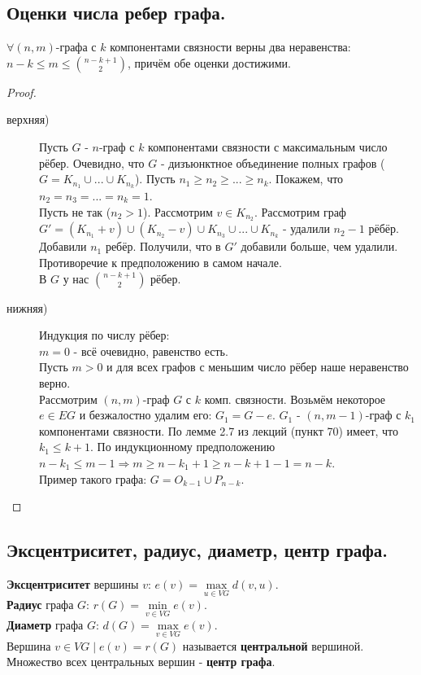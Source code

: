\documentclass[12pt]{article}
\begin{document}
\subsection{Оценки числа ребер графа.}
		$\forall (n,m)$-графа с $k$ компонентами связности верны два неравенства: $ \displaystyle n-k \le m \le \binom{n-k+1}{2}$, причём обе оценки достижими.
	\begin{proof}\hfil
		\begin{description}
			\item[верхняя)] Пусть $G$ - $n$-граф с $k$ компонентами связности с максимальным число рёбер. Очевидно, что $G$ - дизъюнктное объединение полных графов
				($G = K_{n_1} \cup ... \cup K_{n_k}$). Пусть $n_1 \ge n_2 \ge ... \ge n_k$. Покажем, что $n_2 = n_3 = ... = n_k = 1$.\\
				Пусть не так ($n_2 > 1$). Рассмотрим $v \in K_{n_2}$. Рассмотрим граф $G' = (K_{n_1} + v) \cup (K_{n_2} - v) \cup K_{n_3} \cup ... \cup K_{n_k} $ - 
				удалили $n_2-1$ рёбёр. Добавили $n_1$ ребёр. Получили, что в $G'$ добавили больше, чем удалили. Противоречие к предположению в самом начале.\\
				В $G$ у нас $\binom{n-k+1}{2}$ рёбер.
			\item[нижняя)] Индукция по числу рёбер:\\
				$m=0$ - всё очевидно, равенство есть.\\
				Пусть $m>0$ и для всех графов с меньшим число рёбер наше неравенство верно.\\
				Рассмотрим $(n,m)$-граф $G$ с $k$ комп. связности. Возьмём некоторое $e \in EG$ и безжалостно удалим его: $G_1 = G-e$. $G_1$ - $(n,m-1)$-граф с $k_1$ компонентами связности. По лемме 2.7 из лекций (пункт 70) имеет, что $k_1 \le k+1$. По индукционному предположению $n-k_1 \le m-1 \Rightarrow m\ge n-k_1+1 \ge n-k+1-1=n-k$.\\
				Пример такого графа: $G = O_{k-1} \cup P_{n-k}$.
		\end{description}
	\end{proof}
\subsection{Эксцентриситет, радиус, диаметр, центр графа.}
	\textbf{Эксцентриситет} вершины $v$: $e(v) =  \underset{ u \in VG}{\max} d(v,u)$.\\
	\textbf{Радиус} графа $G$: $r(G) = \underset{v \in VG}{\min} e(v)$.\\
	\textbf{Диаметр} графа $G$: $d(G) = \underset{v \in VG}{\max} e(v)$.\\
	Вершина $v \in VG\mid e(v) = r(G)$ называется \textbf{центральной} вершиной.\\
	Множество всех центральных вершин - \textbf{центр графа}.
\end{document}
